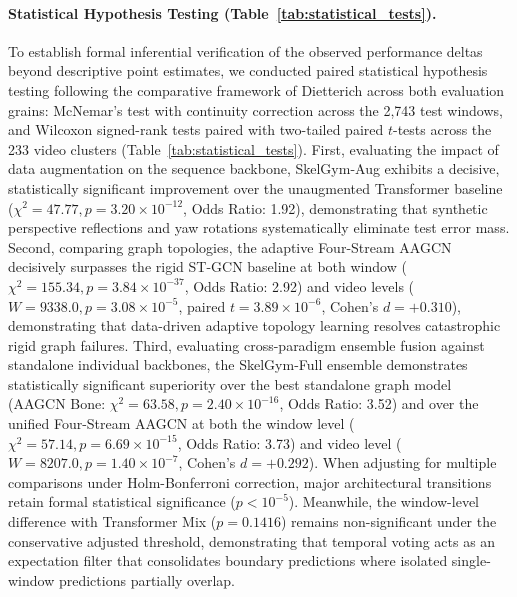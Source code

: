 \documentclass[runningheads]{llncs}
\begin{document}
\paragraph{Statistical Hypothesis Testing (Table~\ref{tab:statistical_tests}).} To establish formal inferential verification of the observed performance deltas beyond descriptive point estimates, we conducted paired statistical hypothesis testing following the comparative framework of Dietterich \cite{dietterich1998} across both evaluation grains: McNemar's test with continuity correction \cite{mcnemar1947} across the 2,743 test windows, and Wilcoxon signed-rank tests \cite{wilcoxon1945} paired with two-tailed paired $t$-tests across the 233 video clusters (Table~\ref{tab:statistical_tests}).
First, evaluating the impact of data augmentation on the sequence backbone, SkelGym-Aug exhibits a decisive, statistically significant improvement over the unaugmented Transformer baseline ($\chi^2 = 47.77, p = 3.20 \times 10^{-12}$, Odds Ratio: 1.92), demonstrating that synthetic perspective reflections and yaw rotations systematically eliminate test error mass.
Second, comparing graph topologies, the adaptive Four-Stream AAGCN decisively surpasses the rigid ST-GCN baseline at both window ($\chi^2 = 155.34, p = 3.84 \times 10^{-37}$, Odds Ratio: 2.92) and video levels ($W = 9338.0, p = 3.08 \times 10^{-5}$, paired $t = 3.89 \times 10^{-6}$, Cohen's $d = +0.310$), demonstrating that data-driven adaptive topology learning resolves catastrophic rigid graph failures.
Third, evaluating cross-paradigm ensemble fusion against standalone individual backbones, the SkelGym-Full ensemble demonstrates statistically significant superiority over the best standalone graph model (AAGCN Bone: $\chi^2 = 63.58, p = 2.40 \times 10^{-16}$, Odds Ratio: 3.52) and over the unified Four-Stream AAGCN at both the window level ($\chi^2 = 57.14, p = 6.69 \times 10^{-15}$, Odds Ratio: 3.73) and video level ($W = 8207.0, p = 1.40 \times 10^{-7}$, Cohen's $d = +0.292$). When adjusting for multiple comparisons under Holm-Bonferroni correction, major architectural transitions retain formal statistical significance ($p < 10^{-5}$). Meanwhile, the window-level difference with Transformer Mix ($p = 0.1416$) remains non-significant under the conservative adjusted threshold, demonstrating that temporal voting acts as an expectation filter that consolidates boundary predictions where isolated single-window predictions partially overlap.
\end{document}
